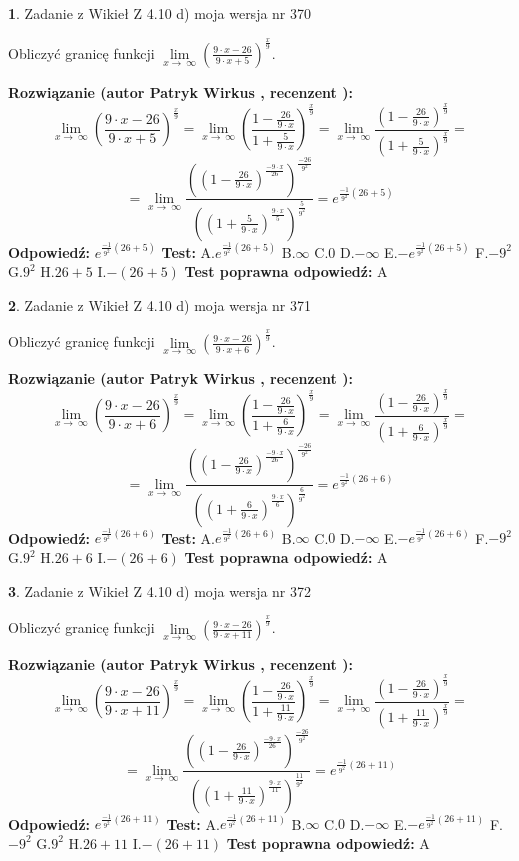 \documentclass[12pt, a4paper]{article}
\theoremstyle{definition} %
\newtheorem{zad}{}
\newcommand{\zadStart}[1]{\begin{zad}#1\newline}
\newcommand{\zadStop}{\end{zad}}
\newcommand{\rozwStart}[2]{\noindent \textbf{Rozwiązanie (autor #1 , recenzent #2): }\newline}
\newcommand{\rozwStop}{\newline}
\newcommand{\odpStart}{\noindent \textbf{Odpowiedź:}\newline}
\newcommand{\odpStop}{\newline}
\newcommand{\testStart}{\noindent \textbf{Test:}\newline}
\newcommand{\testStop}{\newline}
\newcommand{\kluczStart}{\noindent \textbf{Test poprawna odpowiedź:}\newline}
\newcommand{\kluczStop}{\newline}
\begin{document}
\zadStart{Zadanie z Wikieł Z 4.10 d) moja wersja nr 370}


Obliczyć granicę funkcji  $\lim\limits_{x\to\ \infty}(\frac{9\cdot x-26}{9\cdot x+5})^{\frac{x}{9}}$.
\zadStop
\rozwStart{Patryk Wirkus}{}
$$\lim\limits_{x\to\ \infty}(\frac{9\cdot x-26}{9\cdot x+5})^{\frac{x}{9}} = \lim\limits_{x\to\ \infty}(\frac{1-\frac{26}{9\cdot x}}{1+\frac{5}{9\cdot x}})^{\frac{x}{9}}=\lim\limits_{x\to\ \infty}\frac{(1-\frac{26}{9\cdot x})^{\frac{x}{9}}}{(1+\frac{5}{9\cdot x})^{\frac{x}{9}}}=$$
$$=\lim\limits_{x\to\ \infty}\frac{((1-\frac{26}{9\cdot x})^{\frac{-9\cdot x}{26}})^{\frac{-26}{9^{2}}}}{((1+\frac{5}{9\cdot x})^{\frac{9\cdot x}{5}})^{\frac{5}{9^{2}}}}=e^{\frac{-1}{9^{2}}(26+5)}$$
\rozwStop
\odpStart
$e^{\frac{-1}{9^{2}}(26+5)}$
\odpStop
\testStart
A.$e^{\frac{-1}{9^{2}}(26+5)}$ B.$\infty$ C.$0$ D.$-\infty$ E.$-e^{\frac{-1}{9^{2}}(26+5)}$
F.$-9^{2}$ G.$9^{2}$
H.$26+5$
I.$-(26+5)$
\testStop
\kluczStart
A
\kluczStop



\zadStart{Zadanie z Wikieł Z 4.10 d) moja wersja nr 371}


Obliczyć granicę funkcji  $\lim\limits_{x\to\ \infty}(\frac{9\cdot x-26}{9\cdot x+6})^{\frac{x}{9}}$.
\zadStop
\rozwStart{Patryk Wirkus}{}
$$\lim\limits_{x\to\ \infty}(\frac{9\cdot x-26}{9\cdot x+6})^{\frac{x}{9}} = \lim\limits_{x\to\ \infty}(\frac{1-\frac{26}{9\cdot x}}{1+\frac{6}{9\cdot x}})^{\frac{x}{9}}=\lim\limits_{x\to\ \infty}\frac{(1-\frac{26}{9\cdot x})^{\frac{x}{9}}}{(1+\frac{6}{9\cdot x})^{\frac{x}{9}}}=$$
$$=\lim\limits_{x\to\ \infty}\frac{((1-\frac{26}{9\cdot x})^{\frac{-9\cdot x}{26}})^{\frac{-26}{9^{2}}}}{((1+\frac{6}{9\cdot x})^{\frac{9\cdot x}{6}})^{\frac{6}{9^{2}}}}=e^{\frac{-1}{9^{2}}(26+6)}$$
\rozwStop
\odpStart
$e^{\frac{-1}{9^{2}}(26+6)}$
\odpStop
\testStart
A.$e^{\frac{-1}{9^{2}}(26+6)}$ B.$\infty$ C.$0$ D.$-\infty$ E.$-e^{\frac{-1}{9^{2}}(26+6)}$
F.$-9^{2}$ G.$9^{2}$
H.$26+6$
I.$-(26+6)$
\testStop
\kluczStart
A
\kluczStop



\zadStart{Zadanie z Wikieł Z 4.10 d) moja wersja nr 372}


Obliczyć granicę funkcji  $\lim\limits_{x\to\ \infty}(\frac{9\cdot x-26}{9\cdot x+11})^{\frac{x}{9}}$.
\zadStop
\rozwStart{Patryk Wirkus}{}
$$\lim\limits_{x\to\ \infty}(\frac{9\cdot x-26}{9\cdot x+11})^{\frac{x}{9}} = \lim\limits_{x\to\ \infty}(\frac{1-\frac{26}{9\cdot x}}{1+\frac{11}{9\cdot x}})^{\frac{x}{9}}=\lim\limits_{x\to\ \infty}\frac{(1-\frac{26}{9\cdot x})^{\frac{x}{9}}}{(1+\frac{11}{9\cdot x})^{\frac{x}{9}}}=$$
$$=\lim\limits_{x\to\ \infty}\frac{((1-\frac{26}{9\cdot x})^{\frac{-9\cdot x}{26}})^{\frac{-26}{9^{2}}}}{((1+\frac{11}{9\cdot x})^{\frac{9\cdot x}{11}})^{\frac{11}{9^{2}}}}=e^{\frac{-1}{9^{2}}(26+11)}$$
\rozwStop
\odpStart
$e^{\frac{-1}{9^{2}}(26+11)}$
\odpStop
\testStart
A.$e^{\frac{-1}{9^{2}}(26+11)}$ B.$\infty$ C.$0$ D.$-\infty$ E.$-e^{\frac{-1}{9^{2}}(26+11)}$
F.$-9^{2}$ G.$9^{2}$
H.$26+11$
I.$-(26+11)$
\testStop
\kluczStart
A
\kluczStop
\end{document}
